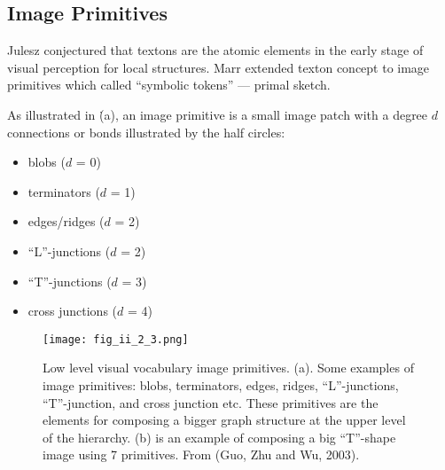 \documentclass[../Notes_of_CaRiVaC.tex]{subfiles}
\begin{document}
\subsection{Image Primitives}%
\label{sec:ii.2.2.2}
Julesz conjectured that textons are the atomic elements in the early stage of
visual perception for local structures. Marr extended texton concept to image
primitives which called ``symbolic tokens'' --- primal sketch.

As illustrated in \.(a), an image primitive is a small image patch
with a degree $d$ connections or bonds illustrated by the half circles:
%
\begin{itemize}
  \item blobs ($d$ = 0)
  \item terminators ($d$ = 1)
  \item edges/ridges ($d$ = 2)
  \item ``L''-junctions ($d$ = 2)
  \item ``T''-junctions ($d$ = 3)
  \item cross junctions ($d$ = 4)
\end{itemize}
%
\begin{figure}[!htpb]
  \centering
  \texttt{[image: fig\_ii\_2\_3.png]}
  \caption{Low level visual vocabulary \- image primitives. (a). Some examples
    of image primitives: blobs, terminators, edges, ridges, ``L''-junctions,
    ``T''-junction, and cross junction etc. These primitives are the elements
    for composing a bigger graph structure at the upper level of the hierarchy.
    (b) is an example of composing a big ``T''-shape image using 7 primitives.
    From (Guo, Zhu and Wu, 2003).}%
  \label{fig:ii.2.3}
\end{figure}
%
\end{document}
